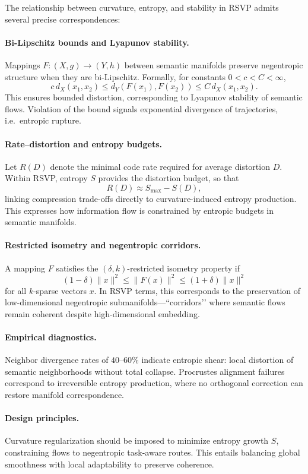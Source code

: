 \documentclass{article}
\theoremstyle{definition}
\begin{document}
The relationship between curvature, entropy, and stability in RSVP admits
several precise correspondences:

\paragraph{Bi-Lipschitz bounds and Lyapunov stability.}  
Mappings $F : (X,g) \to (Y,h)$ between semantic manifolds preserve
negentropic structure when they are bi-Lipschitz. Formally, for constants
$0<c<C<\infty$,
\[
c \, d_X(x_1,x_2) \leq d_Y(F(x_1),F(x_2)) \leq C \, d_X(x_1,x_2).
\]
This ensures bounded distortion, corresponding to Lyapunov stability of
semantic flows. Violation of the bound signals exponential divergence of
trajectories, i.e.\ entropic rupture.

\paragraph{Rate–distortion and entropy budgets.}  
Let $R(D)$ denote the minimal code rate required for average distortion $D$.
Within RSVP, entropy $S$ provides the distortion budget, so that
\[
R(D) \approx S_{\max} - S(D),
\]
linking compression trade-offs directly to curvature-induced entropy
production. This expresses how information flow is constrained by entropic
budgets in semantic manifolds.

\paragraph{Restricted isometry and negentropic corridors.}  
A mapping $F$ satisfies the $(\delta,k)$-restricted isometry property if
\[
(1-\delta)\|x\|^2 \leq \|F(x)\|^2 \leq (1+\delta)\|x\|^2
\]
for all $k$-sparse vectors $x$. In RSVP terms, this corresponds to the
preservation of low-dimensional negentropic submanifolds—``corridors’’ where
semantic flows remain coherent despite high-dimensional embedding.

\paragraph{Empirical diagnostics.}  
Neighbor divergence rates of $40$--$60\%$ indicate entropic shear: local
distortion of semantic neighborhoods without total collapse. Procrustes
alignment failures correspond to irreversible entropy production, where no
orthogonal correction can restore manifold correspondence.

\paragraph{Design principles.}  
Curvature regularization should be imposed to minimize entropy growth $S$,
constraining flows to negentropic task-aware routes. This entails balancing
global smoothness with local adaptability to preserve coherence.
\end{document}

